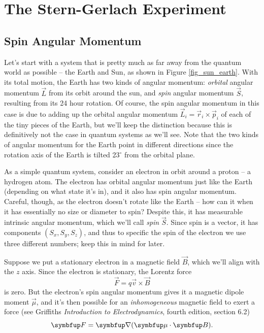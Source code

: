 \chapter{The Stern-Gerlach Experiment}

\section{Spin Angular Momentum}

Let's start with a system that is pretty much as far away from the quantum world as possible -- the Earth and Sun, as shown in Figure \ref{fig_sun_earth}.  With its total motion, the Earth has two kinds of angular momentum:  \emph{orbital} angular momentum $\vec{L}$ from its orbit around the sun, and \emph{spin} angular momentum $\vec{S}$, resulting from its 24 hour rotation.  Of course, the spin angular momentum in this case is due to adding up the orbital angular momentum $\vec{L}_i = \vec{r}_i \times \vec{p}_i$ of each of the tiny pieces of the Earth, but we'll keep the distinction because this is definitively not the case in quantum systems as we'll see.  Note that the two kinds of angular momentum for the Earth point in different directions since the rotation axis of the Earth is tilted 23$^\circ$ from the orbital plane.

As a simple quantum system, consider an electron in orbit around a proton -- a hydrogen atom.  The electron has orbital angular momentum just like the Earth (depending on what state it's in), and it also has spin angular momentum.  Careful, though, as the electron doesn't rotate like the Earth -- how can it when it has essentially no size or diameter to spin?  Despite this, it has measurable intrinsic angular momentum, which we'll call \emph{spin} $\vec{S}$.  Since spin is a vector, it has components $(S_x, S_y, S_z)$, and thus to specific the spin of the electron we use three different numbers; keep this in mind for later.

Suppose we put a stationary electron in a magnetic field $\vec{B}$, which we'll align with the $z$ axis.  Since the electron is stationary, the Lorentz force
\[
\vec{F} = q\vec{v} \times \vec{B}
\]
is zero.  But the electron's spin angular momentum gives it a magnetic dipole moment $\vec{\mu}$, and it's then possible for an \emph{inhomogeneous} magnetic field to exert a force (see Griffiths \emph{Introduction to Electrodynamics}, fourth edition, section 6.2)
\begin{equation}
\vec{F} = \grad (\vec{\mu} \cdot \vec{B}).
\end{equation}

